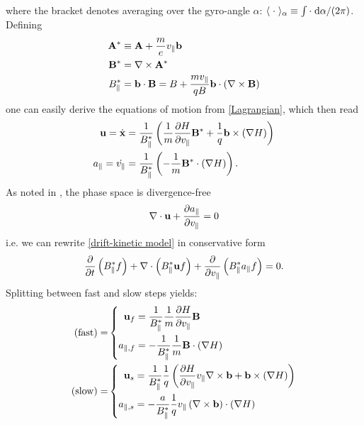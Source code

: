 where the bracket denotes averaging over the gyro-angle $\alpha$: $\langle \;\cdot\; \rangle_\alpha \equiv \int \cdot\;\text{d} \alpha / (2\pi)$.\\
Defining
\begin{subequations}
	\begin{align}
		\mathbf{A}^\ast & \equiv \mathbf{A} + \frac{m}{e} v_\parallel \mathbf{b} \\
		\mathbf{B}^\ast & = \nabla \times \mathbf{A}^\ast \\
		B_\parallel^\ast & = \mathbf{b} \cdot \mathbf{B} = B + \frac{m v_\parallel}{q B} \mathbf{b} \cdot \left( \nabla \times \mathbf{B} \right)
	\end{align}
\end{subequations}
one can easily derive the equations of motion from \eqref{Lagrangian}, which then read
\begin{subequations}
	\begin{align}
		\mathbf{u} = \dot{\mathbf{x}} & = \frac{1}{B_\parallel^\ast} \left( \frac{1}{m} \frac{\partial H}{\partial v_\parallel} \mathbf{B}^\ast + \frac{1}{q} \mathbf{b} \times \left(\nabla H\right) \right) \label{eom for bu} \\
		a_\parallel = \dot{v_\parallel} & = \frac{1}{B_\parallel^\ast} \left( -\frac{1}{m} \mathbf{B}^\ast \cdot \left( \nabla H \right) \right). \label{eom for ap}
	\end{align}
\end{subequations}
As noted in \cite{Latu_2017}, the phase space is divergence-free
\begin{equation}
	\nabla \cdot \mathbf{u} + \frac{\partial a_\parallel}{\partial v_\parallel} = 0
\end{equation}
i.e. we can rewrite \eqref{drift-kinetic model} in conservative form
\begin{equation}\label{conservation1}
	\frac{\partial }{\partial t}\left(B_\parallel^\ast f\right) + \nabla\cdot\left( B_\parallel^\ast \mathbf{u} f \right) + \frac{\partial }{\partial v_\parallel} \left( B_\parallel^\ast a_\parallel f \right) = 0.
\end{equation}
Splitting between fast and slow steps yields:
\begin{subequations}
	\begin{align}
		(\text{fast}) = & \left\{ \begin{aligned}
			\mathbf{u}_f & = \frac{1}{B_\parallel^\ast} \frac{1}{m} \frac{\partial H}{\partial v_\parallel} \mathbf{B} \\
			a_{\parallel, f} & = -\frac{1}{B_\parallel^\ast} \frac{1}{m} \mathbf{B} \cdot \left( \nabla H \right)
		\end{aligned} \right. \label{split step fast}\\
		(\text{slow}) = &  \left\{ \begin{aligned}
			\mathbf{u}_s & = \frac{1}{B_\parallel^\ast} \frac{1}{q} \left( \frac{\partial H}{\partial v_\parallel} v_\parallel \nabla \times \mathbf{b} + \mathbf{b} \times \left(\nabla H\right) \right) \\
			a_{\parallel, s} & = - \frac{a}{B_\parallel^\ast} \frac{1}{q} v_\parallel \left( \nabla \times \mathbf{b} \right) \cdot \left( \nabla H \right)
		\end{aligned} \right. \label{split step slow}
	\end{align}
\end{subequations}
